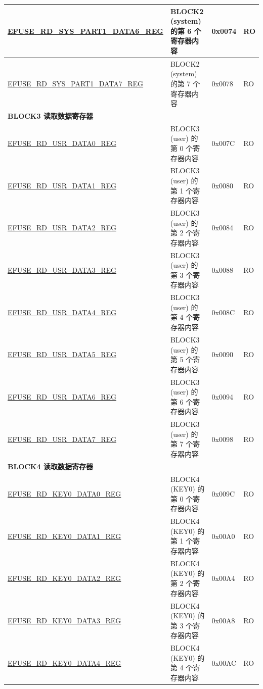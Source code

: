 \begin{longtable}{ | p{7cm} | p{7.2cm} | p{1.3cm} | p{1cm} | }
\hyperref[regdesc:EFUSERDSYSPART1DATANREG]{EFUSE\_RD\_SYS\_PART1\_DATA6\_REG} & BLOCK2 (system) 的第 6 个寄存器内容 & 0x0074 & RO \\ \hline
\hyperref[regdesc:EFUSERDSYSPART1DATANREG]{EFUSE\_RD\_SYS\_PART1\_DATA7\_REG} & BLOCK2 (system) 的第 7 个寄存器内容 & 0x0078 & RO \\ \hline
\multicolumn{4}{|l|}{\textbf{BLOCK3 读取数据寄存器}} \\ \hline
\hyperref[regdesc:EFUSERDUSRDATAMREG]{EFUSE\_RD\_USR\_DATA0\_REG} & BLOCK3 (user) 的第 0 个寄存器内容 & 0x007C & RO \\ \hline
\hyperref[regdesc:EFUSERDUSRDATAMREG]{EFUSE\_RD\_USR\_DATA1\_REG} & BLOCK3 (user) 的第 1 个寄存器内容 & 0x0080 & RO \\ \hline
\hyperref[regdesc:EFUSERDUSRDATAMREG]{EFUSE\_RD\_USR\_DATA2\_REG} & BLOCK3 (user) 的第 2 个寄存器内容 & 0x0084 & RO \\ \hline
\hyperref[regdesc:EFUSERDUSRDATAMREG]{EFUSE\_RD\_USR\_DATA3\_REG} & BLOCK3 (user) 的第 3 个寄存器内容 & 0x0088 & RO \\ \hline
\hyperref[regdesc:EFUSERDUSRDATAMREG]{EFUSE\_RD\_USR\_DATA4\_REG} & BLOCK3 (user) 的第 4 个寄存器内容 & 0x008C & RO \\ \hline
\hyperref[regdesc:EFUSERDUSRDATAMREG]{EFUSE\_RD\_USR\_DATA5\_REG} & BLOCK3 (user) 的第 5 个寄存器内容 & 0x0090 & RO \\ \hline
\hyperref[regdesc:EFUSERDUSRDATAMREG]{EFUSE\_RD\_USR\_DATA6\_REG} & BLOCK3 (user) 的第 6 个寄存器内容 & 0x0094 & RO \\ \hline
\hyperref[regdesc:EFUSERDUSRDATAMREG]{EFUSE\_RD\_USR\_DATA7\_REG} & BLOCK3 (user) 的第 7 个寄存器内容 & 0x0098 & RO \\ \hline
\multicolumn{4}{|l|}{\textbf{BLOCK4 读取数据寄存器}} \\ \hline
\hyperref[regdesc:EFUSERDKEY0DATANREG]{EFUSE\_RD\_KEY0\_DATA0\_REG} & BLOCK4 (KEY0) 的第 0 个寄存器内容 & 0x009C & RO \\ \hline
\hyperref[regdesc:EFUSERDKEY0DATANREG]{EFUSE\_RD\_KEY0\_DATA1\_REG} & BLOCK4 (KEY0) 的第 1 个寄存器内容 & 0x00A0 & RO \\ \hline
\hyperref[regdesc:EFUSERDKEY0DATANREG]{EFUSE\_RD\_KEY0\_DATA2\_REG} & BLOCK4 (KEY0) 的第 2 个寄存器内容 & 0x00A4 & RO \\ \hline
\hyperref[regdesc:EFUSERDKEY0DATANREG]{EFUSE\_RD\_KEY0\_DATA3\_REG} & BLOCK4 (KEY0) 的第 3 个寄存器内容 & 0x00A8 & RO \\ \hline
\hyperref[regdesc:EFUSERDKEY0DATANREG]{EFUSE\_RD\_KEY0\_DATA4\_REG} & BLOCK4 (KEY0) 的第 4 个寄存器内容 & 0x00AC & RO \\ \hline

\end{longtable}
